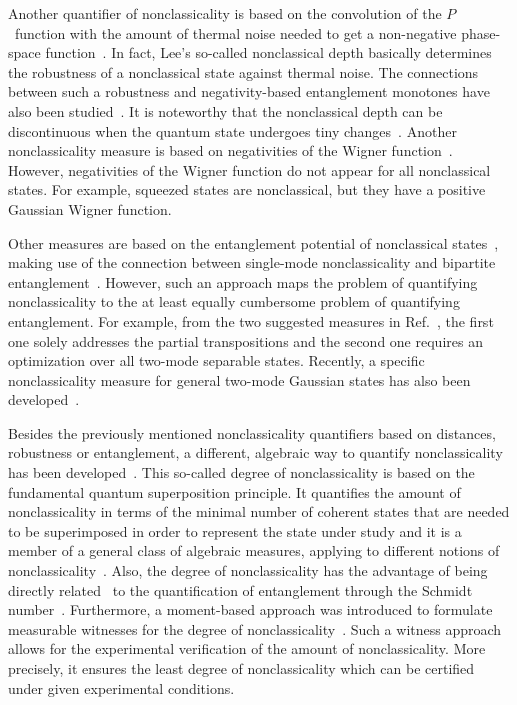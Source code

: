 \documentclass[aps,pra,twocolumn,showpacs,superscriptaddress,10pt]{revtex4-1}
\begin{document}
	Another quantifier of nonclassicality is based on the convolution of the $P$~function with the amount of thermal noise needed to get a non-negative phase-space function~\cite{Lee1991}.
	In fact, Lee's so-called nonclassical depth basically determines the robustness of a nonclassical state against thermal noise.
	The connections between such a robustness and negativity-based entanglement monotones have also been studied~\cite{Miranowicz2015}.
	It is noteworthy that the nonclassical depth can be discontinuous when the quantum state undergoes tiny changes~\cite{Luetkenhaus1995}.
	Another nonclassicality measure is based on negativities of the Wigner function~\cite{Kenfack2004}.
	However, negativities of the Wigner function do not appear for all nonclassical states.
	For example, squeezed states are nonclassical, but they have a positive Gaussian Wigner function.

	Other measures are based on the entanglement potential of nonclassical states~\cite{Asboth2005}, making use of the connection between single-mode nonclassicality and bipartite entanglement~\cite{Aharonov1966,Kim2002,Wang2002}.
	However, such an approach maps the problem of quantifying nonclassicality to the at least equally cumbersome problem of quantifying entanglement.
	For example, from the two suggested measures in Ref.~\cite{Asboth2005}, the first one solely addresses the partial transpositions and the second one requires an optimization over all two-mode separable states.
	Recently, a specific nonclassicality measure for general two-mode Gaussian states has also been developed~\cite{Miranowicz2016,Arkhipov2016}.

	Besides the previously mentioned nonclassicality quantifiers based on distances, robustness or entanglement, a different, algebraic way to quantify nonclassicality has been developed~\cite{Gehrke2012}.
	This so-called degree of nonclassicality is based on the fundamental quantum superposition principle.
	It quantifies the amount of nonclassicality in terms of the minimal number of coherent states that are needed to be superimposed in order to represent the state under study and it is a member of a general class of algebraic measures, applying to different notions of nonclassicality~\cite{Sperling2015}.
	Also, the degree of nonclassicality has the advantage of being directly related~\cite{Vogel2014} to the quantification of entanglement through the Schmidt number~\cite{Sanpera2001,Ternal2000}.
	Furthermore, a moment-based approach was introduced to formulate measurable witnesses for the degree of nonclassicality~\cite{Mraz2014}.
	Such a witness approach allows for the experimental verification of the amount of nonclassicality.
	More precisely, it ensures the least degree of nonclassicality which can be certified under given experimental conditions.
\end{document}
